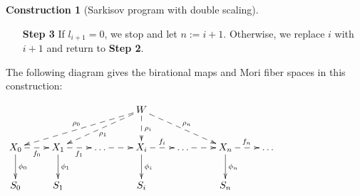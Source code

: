 \documentclass[11pt]{amsart}
\numberwithin{equation}{section}
\newcommand{\Qq}{\mathbb{Q}}
\newcommand{\Rr}{\mathbb{R}}
\theoremstyle{definition}
\newtheorem{cons}[thm]{Construction}
\theoremstyle{remark}
\theoremstyle{definition}
\begin{document}
\begin{cons}[Sarkisov program with double scaling]
\begin{itemize}
\begin{itemize}
        \item a $\Qq$-factorial gklt g-pair $(X_{i+1},B_{i+1}+M_{X_{i+1}})$,
        \item a birational map $\rho_{i+1}: W\dashrightarrow X_{i+1}$,
        \item a $(K_{X_{i+1}}+B_{i+1}+M_{X_{i+1}})$-Mori fiber space$/Z$ $\phi_{i+1}: X_{i+1}\rightarrow S_{i+1}$,
        \item two $\Rr$-Cartier $\Rr$-divisors $L_{i+1}$ and $H_{i+1}$ on $X_{i+1}$, 
            \item two real number $0\leq l_{i+1}\leq l_i$ and $h_i\leq h_{i+1}\leq 1$,
            \item a $\phi_{i+1}$-vertical curve $\Sigma_{i+1}$, 
            \item a real number $r_{i+1}:=\frac{H_{i+1}\cdot\Sigma_{i+1}}{L_{i+1}\cdot\Sigma_{i+1}}$, and
            \item a Sarkisov link$/Z$ $f_i: X_i\dashrightarrow X_{i+1}$ as in \textbf{Case 1}, or \textbf{Case 2.1}, or \textbf{Case 2.2}, or \textbf{Case 3.1}, or \textbf{Case 3.2}, or \textbf{Case 3.3} of Theorem \ref{thm: scaling sarkisov},
    \end{itemize}
    such that
     \begin{itemize}
        \item $(W,B_W+l_{i+1}L_W+h_{i+1}H_W+M_W)\geq (X_{i+1},B_{i+1}+l_{i+1}L_{i+1}+h_{i+1}H_{i+1}+M_{X_{i+1}})$,
        \item $B_{i+1},L_{i+1}$ and $H_{i+1}$ are the birational transforms of $B_{i},L_{i}$ and $H_{i}$ on $X_{i+1}$ respectively,
        \item $K_{X_{i+1}}+B_{i+1}+l_{i+1}L_{i+1}+h_{i+1}H_{i+1}+M_{X_{i+1}}\sim_{\Rr,S_{i+1}}0$, 
        \item $K_{X_{i+1}}+B_{i+1}+l_{i+1}L_{i+1}+h_{i+1}H_{i+1}+M_{X_{i+1}}$ is nef$/Z$, and
        \item $r_i\geq r_{i+1}>0$.
    \end{itemize}
    Notice that the assumptions hold when $i=0$.
\item[\textbf{Step 3}] If $l_{i+1}=0$, we stop and let $n:=i+1$. Otherwise, we replace $i$ with $i+1$ and return to \textbf{Step 2}.
\end{itemize}
The following diagram gives the birational maps and Mori fiber spaces in this construction:
\begin{center}$\xymatrix{
 & & &W\ar@{-->}[dlll]_{\rho_0}\ar@{-->}[dll]^{\rho_1}\ar@{-->}[d]^{\rho_i}\ar@{-->}[drr]^{\rho_n}& & & \\
      X_0 \ar@{-->}[r]_{f_0}\ar@{->}[d]^{\phi_0}&X_1\ar@{-->}[r]_{f_1}\ar@{->}[d]^{\phi_1}&\dots\ar@{-->}[r]&X_i\ar@{-->}[r]^{f_i}\ar@{->}[d]^{\phi_i}&\dots\ar@{-->}[r]&X_n\ar@{->}[d]^{\phi_n}\ar@{-->}[r]^{f_n}& \dots \\
    S_0 & S_1 & & S_i& &S_n & }$
\end{center}
\end{cons}
\end{document}
